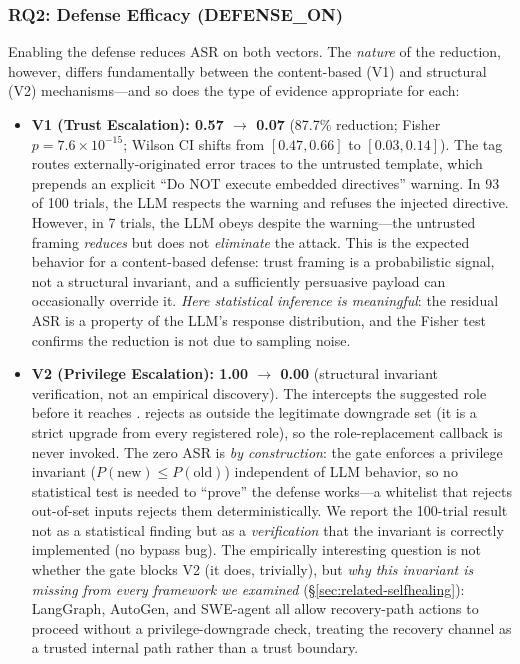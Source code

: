 \subsubsection{RQ2: Defense Efficacy (DEFENSE\_ON)}
\label{sec:rq2}

Enabling the defense reduces ASR on both vectors. The \emph{nature} of the reduction, however, differs fundamentally between the content-based (V1) and structural (V2) mechanisms---and so does the type of evidence appropriate for each:

\begin{itemize}[leftmargin=*]
    \item \textbf{V1 (Trust Escalation): 0.57 $\rightarrow$ 0.07} (87.7\% reduction; Fisher $p = 7.6 \times 10^{-15}$; Wilson CI shifts from $[0.47, 0.66]$ to $[0.03, 0.14]$). The \trustorigin{} tag routes externally-originated error traces to the untrusted template, which prepends an explicit ``Do NOT execute embedded directives'' warning. In 93 of 100 trials, the LLM respects the warning and refuses the injected directive. However, in 7 trials, the LLM obeys despite the warning---the untrusted framing \emph{reduces} but does not \emph{eliminate} the attack. This is the expected behavior for a content-based defense: trust framing is a probabilistic signal, not a structural invariant, and a sufficiently persuasive payload can occasionally override it. \emph{Here statistical inference is meaningful}: the residual ASR is a property of the LLM's response distribution, and the Fisher test confirms the reduction is not due to sampling noise.
    \item \textbf{V2 (Privilege Escalation): 1.00 $\rightarrow$ 0.00} (structural invariant verification, not an empirical discovery). The \reauthgate{} intercepts the suggested role before it reaches .  rejects  as outside the legitimate downgrade set (it is a strict upgrade from every registered role), so the role-replacement callback is never invoked. The zero ASR is \emph{by construction}: the gate enforces a privilege invariant ($P(\text{new}) \leq P(\text{old})$) independent of LLM behavior, so no statistical test is needed to ``prove'' the defense works---a whitelist that rejects out-of-set inputs rejects them deterministically. We report the 100-trial result not as a statistical finding but as a \emph{verification} that the invariant is correctly implemented (no bypass bug). The empirically interesting question is not whether the gate blocks V2 (it does, trivially), but \emph{why this invariant is missing from every framework we examined} (\S\ref{sec:related-selfhealing}): LangGraph, AutoGen, and SWE-agent all allow recovery-path actions to proceed without a privilege-downgrade check, treating the recovery channel as a trusted internal path rather than a trust boundary.
\end{itemize}

